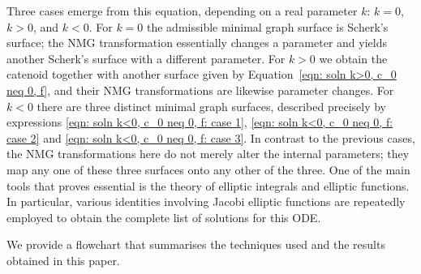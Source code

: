 \documentclass[12pt]{article}
\theoremstyle{plain}
\theoremstyle{definition}
\theoremstyle{remark}
\begin{document}
	Three cases emerge from this equation, depending on a real parameter \(k\): \(k=0\), \(k>0\), and \(k<0\).  
	For \(k=0\) the admissible minimal graph surface is Scherk’s surface; the NMG transformation essentially changes a parameter and yields another Scherk’s surface with a different parameter.  
	For \(k>0\) we obtain the catenoid together with another surface given by Equation~\ref{eqn: soln k>0, c_0 neq 0, f}, and their NMG transformations are likewise parameter changes.  
	For \(k<0\) there are three distinct minimal graph surfaces, described precisely by expressions \ref{eqn: soln k<0, c_0 neq 0, f: case 1}, \ref{eqn: soln k<0, c_0 neq 0, f: case 2} and \ref{eqn: soln k<0, c_0 neq 0, f: case 3}. In contrast to the previous cases, the NMG transformations here do not merely alter the internal parameters; they map any one of these three surfaces onto any other of the three. One of the main tools that proves essential is the theory of elliptic integrals and elliptic functions. In particular, various identities involving Jacobi elliptic functions are repeatedly employed to obtain the complete list of solutions for this ODE.
	
	We provide a flowchart that summarises the techniques used and the results obtained in this paper. 
	 
\end{document}
